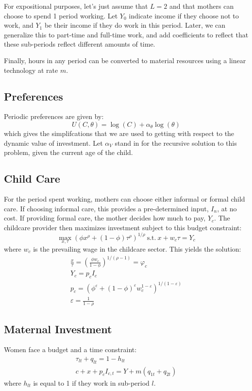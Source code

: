 \documentclass[12pt]{article}
\numberwithin{equation}{section}
\numberwithin{figure}{section}
\numberwithin{table}{section}
\begin{document}
For expositional purposes, let's just assume that $L=2$ and that mothers can choose to spend 1 period working. Let $Y_0$ indicate income if they choose not to work, and $Y_1$ be their income if they do work in this period. Later, we can generalize this to part-time and full-time work, and add coefficients to reflect that these sub-periods reflect different amounts of time.

Finally, hours in any period can be converted to material resources using a linear technology at rate $m$.

\subsection{Preferences}
Periodic preferences are given by:
\[U(C,\theta) = \log(C) + \alpha_\theta\log(\theta) \]
which gives the simplifcations that we are used to getting with respect to the dynamic value of investment. Let $\alpha_V$ stand in for the recursive solution to this problem, given the current age of the child.

\subsection{Child Care}
For the period spent working, mothers can choose either informal or formal child care. If choosing informal care, this provides a pre-determined input, $I_n$, at no cost. If providing formal care, the mother decides how much to pay, $Y_c$. The childcare provider then maximizes investment subject to this budget constraint:
\[\max_{x,\tau}\left(\phi x^\rho + (1-\phi)\tau^\rho\right)^{1/\rho}\ \text{s.t.}\ x + w_c\tau = Y_c \]
where $w_c$ is the prevailing wage in the childcare sector.
This yields the solution:
\begin{eqnarray}
\frac{x}{\tau} = \left(\frac{\phi w_c}{1-\phi}\right)^{1/(\rho-1)} = \varphi_c \\
Y_c = p_cI_c \\
p_c = \left(\phi^\varepsilon + (1-\phi)^\varepsilon w_c^{1-\varepsilon}\right)^{1/(1-\varepsilon)} \\
\varepsilon = \frac{1}{1-\rho}
\end{eqnarray}

\subsection{Maternal Investment}
Women face a budget and a time constraint:
\begin{eqnarray}
\tau_{lt} + q_{lt} = 1-h_{lt} \\
c + x + p_c I_{c,t} = Y + m(q_{1t} + q_{2t})
\end{eqnarray}
where $h_{lt}$ is equal to 1 if they work in sub-period $l$.
\end{document}
